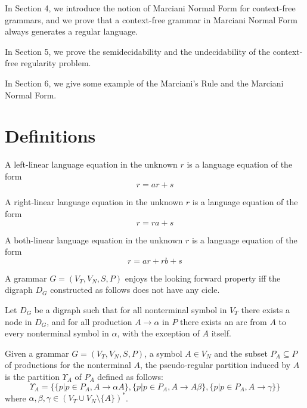 \documentclass[prodmode,acmtecs]{acmsmall}
\begin{document}
In Section 4, we introduce the notion of Marciani Normal Form for
context-free grammars, and we prove that a context-free grammar in
Marciani Normal Form always generates a regular language.

In Section 5, we prove the semidecidability and the undecidability
of the context-free regularity problem.

In Section 6, we give some example of the Marciani's Rule and the
Marciani Normal Form.

\section{Definitions}
\begin{definition}
	A left-linear language equation in
	the unknown $r$ is a language equation of the form
	\begin{equation}
	r=ar+s
	\end{equation}
\end{definition}

\begin{definition}
	A right-linear language equation
	in the unknown $r$ is a language equation of the form
	\begin{equation}
	r=ra+s
	\end{equation}
\end{definition}

\begin{definition}
	A both-linear language equation in
	the unknown $r$ is a language equation of the form
	\begin{equation}
	r=ar+rb+s
	\end{equation}
\end{definition}

\begin{definition}
	A grammar $G=(V_{T},V_{N},S,P)$
	enjoys the looking forward property iff the digraph $D_{G}$ constructed
	as follows does not have any cicle.

	Let $D_{G}$ be a digraph such that for all nonterminal symbol in
	$V_{T}$ there exists a node in $D_{G}$, and for all production $A\rightarrow\alpha$
	in $P$ there exists an arc from $A$ to every nonterminal symbol
	in $\alpha$, with the exception of $A$ itself.
\end{definition}

\begin{definition}
	Given a grammar $G=(V_{T},V_{N},S,P)$,
	a symbol $A\in V_{N}$ and the subset $P_{A}\subseteq P$ of productions
	for the nonterminal $A$, the pseudo-regular partition induced by
	$A$ is the partition $\Upsilon_{A}$ of $P_{A}$ defined as follows:
	\begin{equation}
	\Upsilon_{A}=\{\{p|p\in P_{A},A\rightarrow\alpha A\},\{p|p\in P_{A},A\rightarrow A\beta\},\{p|p\in P_{A},A\rightarrow\gamma\}\}
	\end{equation}
	where $\alpha,\beta,\gamma\in\left(V_{T}\cup V_{N}\setminus\{A\}\right)^{*}$.
\end{definition}
\end{document}
